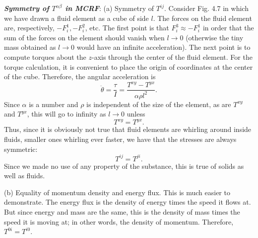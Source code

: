 \documentclass[12pt]{book}
\begin{document}
    \textbf{\textit{Symmetry of \(T^{\alpha \beta}\) in MCRF}}:
    (a) Symmetry of \(T^{ij}\). Consider Fig. 4.7 in which we have drawn a fluid element as a cube of side \(l\). The forces on the fluid element are, respectively, \(-F_i^1, -F_i^2\), etc. The first point is that \(F_i^3 \approx -F_i^1\) in order that the sum of the forces on the element should vanish when \(l \to 0\) (otherwise the tiny mass obtained as \(l \to 0\) would have an infinite acceleration). The next point is to compute torques about the \(z\)-axis through the center of the fluid element. For the torque calculation, it is convenient to place the origin of coordinates at the center of the cube. Therefore, the angular acceleration is
    \[
    \ddot{\theta} = \frac{\tau}{I} = \frac{T^{xy} - T^{yx}}{\alpha \rho l^2}. \tag{4.28}
    \]
    Since \(\alpha\) is a number and \(\rho\) is independent of the size of the element, as are \(T^{xy}\) and \(T^{yx}\), this will go to infinity as \(l \to 0\) unless
    \[
    T^{xy} = T^{yx}.
    \]
    Thus, since it is obviously not true that fluid elements are whirling around inside fluids, smaller ones whirling ever faster, we have that the stresses are always symmetric:
    \[
    T^{ij} = T^{ji}. \tag{4.29}
    \]
    Since we made no use of any property of the substance, this is true of solids as well as fluids.
    
    (b) Equality of momentum density and energy flux. This is much easier to demonstrate. The energy flux is the density of energy times the speed it flows at. But since energy and mass are the same, this is the density of mass times the speed it is moving at; in other words, the density of momentum. Therefore, \(T^{0i} = T^{i0}\).
\end{document}
